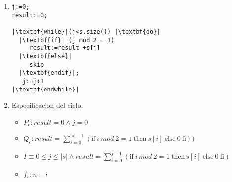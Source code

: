 \documentclass{article}
\begin{document}
\noindent
\begin{enumerate}[label=\alph*)]
	\item 

\begin{lstlisting}
j:=0;
result:=0;

|\textbf{while}|(j<s.size()) |\textbf{do}|
  |\textbf{if}| (j mod 2 = 1) 
     result:=result +s[j]
  |\textbf{else}|
     skip
  |\textbf{endif}|;
   j:=j+1
|\textbf{endwhile}|
\end{lstlisting}
	\item
	
 Especificacion del ciclo:
	\begin{itemize}
		\item $P_c: result=0 \wedge j=0$
		\item $Q_c: result=\sum_{i=0}^{|s|-1}(\textrm{if}\ i\ mod\ 2=1\ \textrm{then}\ s[i]\ \textrm{else}\ 0\ \textrm{fi}))$
		\item $I\equiv 0\leq j\leq |s| \wedge result=\sum_{i=0}^{j-1}(\textrm{if}\ i\ mod\ 2=1\ \textrm{then}\ s[i]\ \textrm{else}\ 0\ \textrm{fi})$
		\item $f_v:n-i$
	\end{itemize}
	

\end{enumerate}
\end{document}
